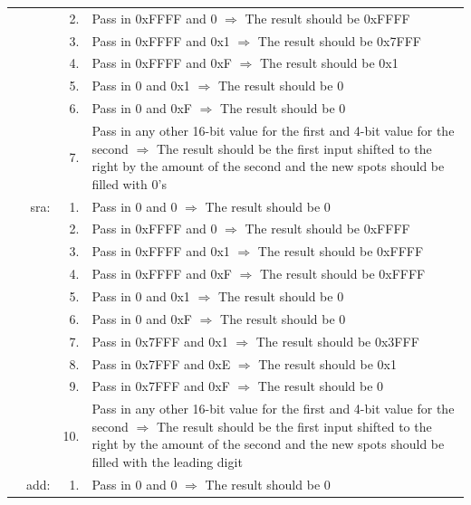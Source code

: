 \documentclass{article}
\begin{document}
\begin{longtable}{ r r r p{11cm} }
				                &      & 2. & Pass in 0xFFFF and 0 $\Rightarrow$ The result should be 0xFFFF\\
				                &      & 3. & Pass in 0xFFFF and 0x1 $\Rightarrow$ The result should be 0x7FFF\\
				                &      & 4. & Pass in 0xFFFF and 0xF $\Rightarrow$ The result should be 0x1\\
				                &      & 5. & Pass in 0 and 0x1 $\Rightarrow$ The result should be 0\\
				                &      & 6. & Pass in 0 and 0xF $\Rightarrow$ The result should be 0\\
				                &      & 7. & Pass in any other 16-bit value for the first and 4-bit value for the second $\Rightarrow$ The result should be the first input shifted to the right by the amount of the second and the new spots should be filled with 0's\\
				                & sra: & 1. & Pass in 0 and 0 $\Rightarrow$ The result should be 0\\
				                &      & 2. & Pass in 0xFFFF and 0 $\Rightarrow$ The result should be 0xFFFF\\
				                &      & 3. & Pass in 0xFFFF and 0x1 $\Rightarrow$ The result should be 0xFFFF\\
				                &      & 4. & Pass in 0xFFFF and 0xF $\Rightarrow$ The result should be 0xFFFF\\
				                &      & 5. & Pass in 0 and 0x1 $\Rightarrow$ The result should be 0\\
				                &      & 6. & Pass in 0 and 0xF $\Rightarrow$ The result should be 0\\
				                &      & 7. & Pass in 0x7FFF and 0x1 $\Rightarrow$ The result should be 0x3FFF\\
				                &      & 8. & Pass in 0x7FFF and 0xE $\Rightarrow$ The result should be 0x1\\
				                &      & 9. & Pass in 0x7FFF and 0xF $\Rightarrow$ The result should be 0\\
				                &      & 10.& Pass in any other 16-bit value for the first and 4-bit value for the second $\Rightarrow$ The result should be the first input shifted to the right by the amount of the second and the new spots should be filled with the leading digit\\
				                & add: & 1. & Pass in 0 and 0 $\Rightarrow$ The result should be 0\\

\end{longtable}
\end{document}
